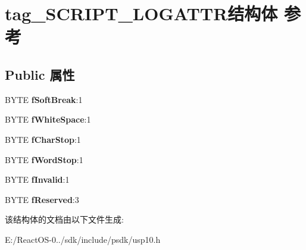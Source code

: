 \hypertarget{structtag___s_c_r_i_p_t___l_o_g_a_t_t_r}{}\section{tag\+\_\+\+S\+C\+R\+I\+P\+T\+\_\+\+L\+O\+G\+A\+T\+T\+R结构体 参考}
\label{structtag___s_c_r_i_p_t___l_o_g_a_t_t_r}
\subsection*{Public 属性}
\begin{DoxyCompactItemize}
\item 
\mbox{\label{structtag___s_c_r_i_p_t___l_o_g_a_t_t_r_aa28c6c184381878ff4f8b58af37293ed}} 
B\+Y\+TE {\bfseries f\+Soft\+Break}\+:1
\item 
\mbox{\label{structtag___s_c_r_i_p_t___l_o_g_a_t_t_r_a77feaeb5b6513f3da66586f375ddebfa}} 
B\+Y\+TE {\bfseries f\+White\+Space}\+:1
\item 
\mbox{\label{structtag___s_c_r_i_p_t___l_o_g_a_t_t_r_aacd2b4136824784875ce3db0e6d7f019}} 
B\+Y\+TE {\bfseries f\+Char\+Stop}\+:1
\item 
\mbox{\label{structtag___s_c_r_i_p_t___l_o_g_a_t_t_r_a67c49783c792966dccba365e6c04fb7d}} 
B\+Y\+TE {\bfseries f\+Word\+Stop}\+:1
\item 
\mbox{\label{structtag___s_c_r_i_p_t___l_o_g_a_t_t_r_a55ea33ff26475e67f0b0b25541ddd185}} 
B\+Y\+TE {\bfseries f\+Invalid}\+:1
\item 
\mbox{\label{structtag___s_c_r_i_p_t___l_o_g_a_t_t_r_a99bb86aab0dd90128ea4e6a6a6d2df08}} 
B\+Y\+TE {\bfseries f\+Reserved}\+:3
\end{DoxyCompactItemize}


该结构体的文档由以下文件生成\+:\begin{DoxyCompactItemize}
\item 
E\+:/\+React\+O\+S-\/0../sdk/include/psdk/usp10.\+h\end{DoxyCompactItemize}

